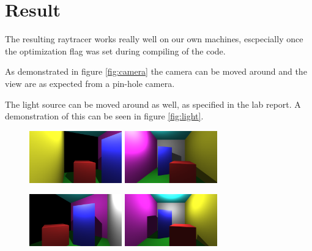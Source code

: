 \documentclass[a4paper]{article}
\begin{document}
\section{Result}
The resulting raytracer works really well on our own machines, escpecially once
the optimization flag was set during compiling of the code. 

As demonstrated in figure \ref{fig:camera} the camera can be moved around and
the view are as expected from a pin-hole camera.

The light source can be moved around as well, as specified in the lab report. A
demonstration of this can be seen in figure \ref{fig:light}.

\begin{figure}[H]
    \centering
    \begin{minipage}{.5\textwidth}
        \centering
        \includegraphics[width=4cm]{720ani0.png}
    \end{minipage}%
    \begin{minipage}{.5\textwidth}
        \centering
        \includegraphics[width=4cm]{light0.png}
    \end{minipage}
\end{figure}

\begin{figure}[H]
    \centering
    \begin{minipage}{.5\textwidth}
        \centering
        \includegraphics[width=4cm]{720ani1.png}
    \end{minipage}%
    \begin{minipage}{.5\textwidth}
        \centering
        \includegraphics[width=4cm]{light1.png}
    \end{minipage}
\end{figure}
\end{document}
